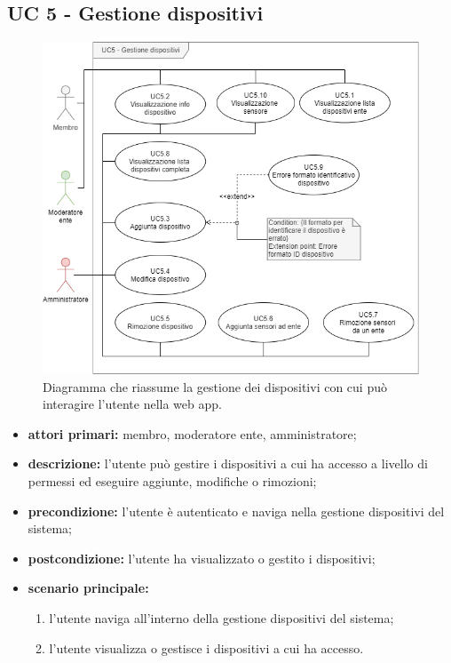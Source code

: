 	\subsection{UC 5 - Gestione dispositivi}
		
		\begin{figure}[H]
			\centering
			\includegraphics[scale=0.60]{res/images/uc5}
			\caption{Diagramma che riassume la gestione dei dispositivi con cui può interagire l'utente nella web app.}
		\end{figure}
		
		\begin{itemize}
			\item \textbf{attori primari:} membro, moderatore ente, amministratore;
			\item \textbf{descrizione:} l'utente può gestire i dispositivi a cui ha accesso a livello di permessi ed eseguire aggiunte, modifiche o rimozioni;
			\item \textbf{precondizione:} l'utente è autenticato e naviga nella gestione dispositivi del sistema;
			\item \textbf{postcondizione:} l'utente ha visualizzato o gestito i dispositivi;
			\item \textbf{scenario principale:}
			\begin{enumerate}
				\item{l'utente naviga all'interno della gestione dispositivi del sistema;}
				\item{l'utente visualizza o gestisce i dispositivi a cui ha accesso.}
			\end{enumerate}
		\end{itemize}


